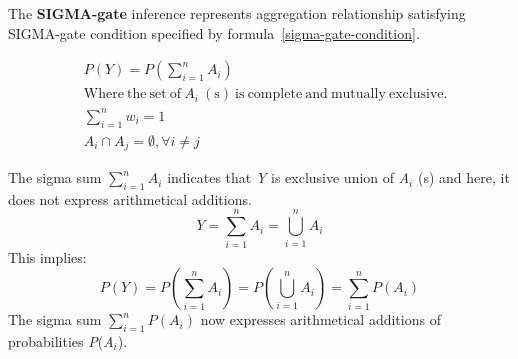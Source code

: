 \documentclass{article}
\numberwithin{equation}{section}
\numberwithin{figure}{section}
\numberwithin{table}{section}
\begin{document}
The \textbf{SIGMA-gate} inference \cite{nguyen:sigma} represents aggregation relationship satisfying SIGMA-gate condition specified by formula~\ref{sigma-gate-condition}.

\begin{equation}
\begin{split}
&P\left(Y\right)=P\left(\sum^n_{i\mathrm{=1}}{A_i}\right)\\
&\mathrm{Where}\ \mathrm{the}\ \mathrm{set}\ \mathrm{of}\ A_i\ \mathrm{(s)}\ \mathrm{is}\ \mathrm{complete}\ \mathrm{and}\ \mathrm{mutually}\ \mathrm{exclusive.}\\
&\sum^n_{i=1}{w_i}=1\\
&A_i\cap A_j=\emptyset ,\forall i\neq j
\end{split}
\label{sigma-gate-condition}
\end{equation}

The sigma sum $\sum^n_{i\mathrm{=1}}{A_i}$ indicates that \textit{Y} is exclusive union of \textit{A${}_{i}$} (s) and here, it does not express arithmetical additions.
\[Y=\sum^n_{i\mathrm{=1}}{A_i}=\bigcup^n_{i=1}{A_i}\] 
This implies:
\[P\left(Y\right)=P\left(\sum^n_{i\mathrm{=1}}{A_i}\right)=P\left(\bigcup^n_{i=1}{A_i}\right)=\sum^n_{i\mathrm{=1}}{P\left(A_i\right)}\] 
The sigma sum $\sum^n_{i\mathrm{=1}}{P\left(A_i\right)}$ now expresses arithmetical additions of probabilities \textit{P}(\textit{A${}_{i}$}).
\end{document}
